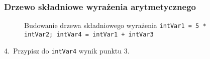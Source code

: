 \documentclass[10pt,t]{beamer}
\begin{document}
\begin{frame}
  \frametitle{Drzewo składniowe wyrażenia arytmetycznego}


  \begin{figure}


    \caption{Budowanie drzewa składniowego wyrażenia
      \texttt{intVar1 = 5 * intVar2; intVar4 = intVar1 + intVar3}}

    \label{fig:Scheme-of-CPU}

  \end{figure}





  4.~Przypisz do \texttt{intVar4} wynik punktu 3.

\end{frame}
\end{document}
